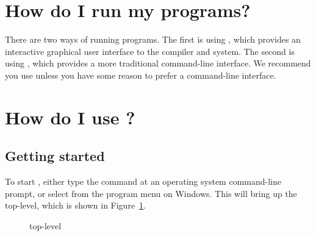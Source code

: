 \section{How do I run my {\eclipse} programs?}
There are two ways of running {\eclipse} programs.
The first is using , which provides an interactive graphical
user interface to the {\eclipse} compiler and system.
The second is using , which provides a more traditional
command-line interface.
We recommend you use {\tkeclipse} unless you have some reason to prefer a
command-line interface.

\section{How do I use \notation{\tkeclipse}?}

\subsection{Getting started}

To start {\tkeclipse}, either type the command  at an
operating system command-line prompt, or select {\tkeclipse} from the
program menu on Windows.
This will bring up the {\tkeclipse} top-level, which is shown in
Figure~\ref{tktop}.

\begin{figure}[bt]
\begin{center}
\end{center}
\caption{{\tkeclipse} top-level}
\label{tktop}
\end{figure}


